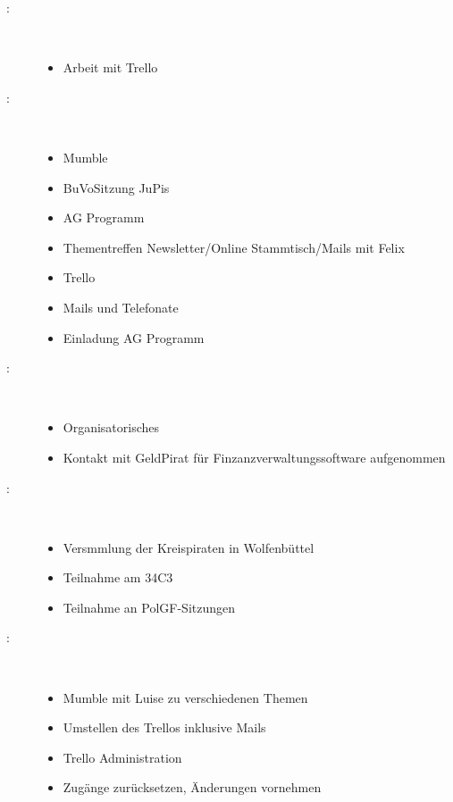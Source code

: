 \begin{Protokoll}
    \begin{description}
        \item[:] \     
        \begin{itemize}
            \item Arbeit mit Trello
        \end{itemize}
        \item[:] \     
        \begin{itemize}
            \item Mumble
            \item BuVoSitzung JuPis
             \item AG Programm
             \item Thementreffen Newsletter/Online Stammtisch/Mails mit Felix
             \item Trello
            \item Mails und Telefonate
            \item Einladung AG Programm
        \end{itemize}
        \item[:] \     
        \begin{itemize}
            \item Organisatorisches
            \item Kontakt mit GeldPirat für Finzanzverwaltungssoftware aufgenommen
        \end{itemize}
        \item[:] \     
        \begin{itemize}
            \item Versmmlung der Kreispiraten in Wolfenbüttel
            \item Teilnahme am 34C3
            \item Teilnahme an PolGF-Sitzungen
        \end{itemize}
        \item[\getPersonAsWebsiteLink{FeW}:] \     
        \begin{itemize}
            \item Mumble mit Luise zu verschiedenen Themen
            \item Umstellen des Trellos inklusive Mails
            \item Trello Administration
            \item Zugänge zurücksetzen, Änderungen vornehmen
        \end{itemize}
    \end{description}
    

\end{Protokoll}
